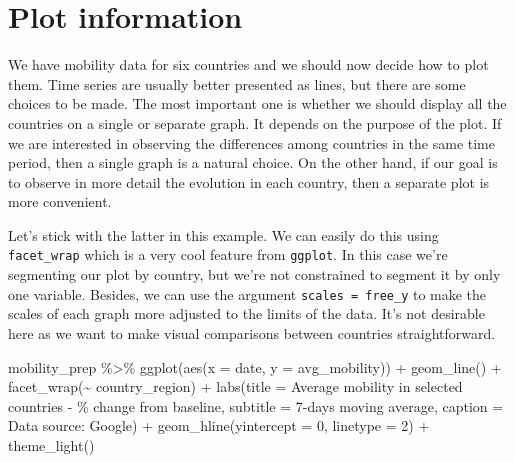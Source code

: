 \documentclass[
]{book}
\newenvironment{Shaded}{\begin{snugshade}}{\end{snugshade}}
\newcommand{\AttributeTok}[1]{\textcolor[rgb]{0.77,0.63,0.00}{#1}}
\newcommand{\DecValTok}[1]{\textcolor[rgb]{0.00,0.00,0.81}{#1}}
\newcommand{\FunctionTok}[1]{\textcolor[rgb]{0.00,0.00,0.00}{#1}}
\newcommand{\NormalTok}[1]{#1}
\newcommand{\SpecialCharTok}[1]{\textcolor[rgb]{0.00,0.00,0.00}{#1}}
\newcommand{\StringTok}[1]{\textcolor[rgb]{0.31,0.60,0.02}{#1}}
\begin{document}
\hypertarget{plot-information}{%
\section{Plot information}\label{plot-information}}

We have mobility data for six countries and we should now decide how to plot them. Time series are usually better presented as lines, but there are some choices to be made. The most important one is whether we should display all the countries on a single or separate graph. It depends on the purpose of the plot. If we are interested in observing the differences among countries in the same time period, then a single graph is a natural choice. On the other hand, if our goal is to observe in more detail the evolution in each country, then a separate plot is more convenient.

Let's stick with the latter in this example. We can easily do this using \texttt{facet\_wrap} which is a very cool feature from \texttt{ggplot}. In this case we're segmenting our plot by country, but we're not constrained to segment it by only one variable. Besides, we can use the argument \texttt{scales\ =\ \textquotesingle{}free\_y\textquotesingle{}} to make the scales of each graph more adjusted to the limits of the data. It's not desirable here as we want to make visual comparisons between countries straightforward.

\begin{Shaded}
\begin{Highlighting}[]
\NormalTok{mobility\_prep }\SpecialCharTok{\%\textgreater{}\%} 
  \FunctionTok{ggplot}\NormalTok{(}\FunctionTok{aes}\NormalTok{(}\AttributeTok{x =}\NormalTok{ date, }\AttributeTok{y =}\NormalTok{ avg\_mobility)) }\SpecialCharTok{+}
  \FunctionTok{geom\_line}\NormalTok{() }\SpecialCharTok{+}
  \FunctionTok{facet\_wrap}\NormalTok{(}\SpecialCharTok{\textasciitilde{}}\NormalTok{ country\_region) }\SpecialCharTok{+}
  \FunctionTok{labs}\NormalTok{(}\AttributeTok{title =} \StringTok{\textquotesingle{}Average mobility in selected countries {-} \% change from baseline\textquotesingle{}}\NormalTok{,}
       \AttributeTok{subtitle =} \StringTok{\textquotesingle{}7{-}days moving average\textquotesingle{}}\NormalTok{,}
       \AttributeTok{caption =} \StringTok{\textquotesingle{}Data source: Google\textquotesingle{}}\NormalTok{) }\SpecialCharTok{+}
  \FunctionTok{geom\_hline}\NormalTok{(}\AttributeTok{yintercept =} \DecValTok{0}\NormalTok{, }\AttributeTok{linetype =} \DecValTok{2}\NormalTok{) }\SpecialCharTok{+}
  \FunctionTok{theme\_light}\NormalTok{()}
\end{Highlighting}
\end{Shaded}
\end{document}
